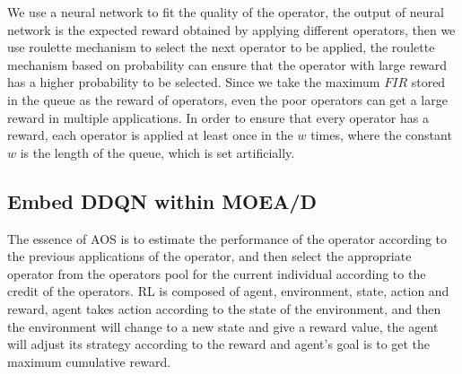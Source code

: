 \documentclass[journal]{IEEEtran}
\begin{document}
We use a neural network to fit the quality of the operator, the output of neural network is the expected reward obtained by applying different operators, then we use roulette mechanism to select the next operator to be applied, the roulette mechanism based on probability can ensure that the operator with large reward has a higher probability to be selected.
Since we take the maximum $FIR$ stored in the queue as the reward of operators, even the poor operators can get a large reward in multiple applications. In order to ensure that every operator has a reward, each operator is applied at least once in the $w$ times, where the constant $w$ is the length of the queue, which is set artificially.


\subsection{Embed DDQN within MOEA/D}
The essence of AOS is to estimate the performance of the operator according to the previous applications of the operator, and then select the appropriate operator from the operators pool for the current individual according to the credit of the operators.
RL is composed of agent, environment, state, action and reward, agent takes action according to the state of the environment, and then the environment will change to a new state and give a reward value, the agent will adjust its strategy according to the reward and agent's goal is to get the maximum cumulative reward.
\end{document}
